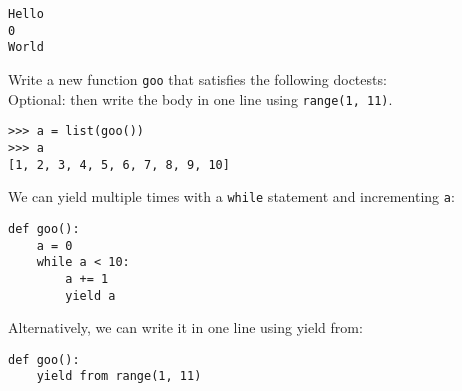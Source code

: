 \begin{solution}[0.5in]
\begin{lstlisting}
Hello
0
World
\end{lstlisting}
\end{solution}
\begin{blocksection}
\question Write a new function \lstinline$goo$ that satisfies the following doctests:
\\Optional: then write the body in one line using \lstinline{range(1, 11)}.
\begin{lstlisting}
>>> a = list(goo())
>>> a
[1, 2, 3, 4, 5, 6, 7, 8, 9, 10]
\end{lstlisting}

\begin{solution}[0.50in]
We can yield multiple times with a \lstinline$while$ statement and incrementing
\lstinline$a$:

\begin{lstlisting}
def goo():
    a = 0
    while a < 10:
        a += 1
        yield a
\end{lstlisting}

Alternatively, we can write it in one line using yield from:
\begin{lstlisting}
def goo():
    yield from range(1, 11)
\end{lstlisting}
\end{solution}
\end{blocksection}

